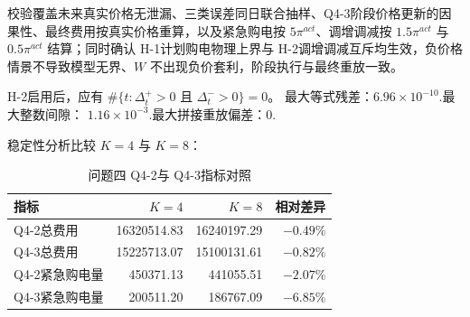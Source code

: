 校验覆盖未来真实价格无泄漏、三类误差同日联合抽样、Q4-3阶段价格更新的因果性、最终费用按真实价格重算，以及紧急购电按 \(5\pi^{act}\)、调增调减按 \(1.5\pi^{act}\) 与 \(0.5\pi^{act}\) 结算；同时确认 H-1计划购电物理上界与 H-2调增调减互斥均生效，负价格情景不导致模型无界、\(W\) 不出现负价套利，阶段执行与最终重放一致。

H-2启用后，应有 \(\#\{t:\Delta_t^+>0\text{ 且 }\Delta_t^->0\}=0\)。 最大等式残差：\(6.96\times10^{-10}.\)最大整数间隙：
\(1.16\times10^{-3}.\)最大拼接重放偏差：\(0.\)

稳定性分析比较 \(K=4\) 与 \(K=8\)：

\begin{table}[H]
\centering
{}
\begin{tabular}{lrrr}
\toprule
指标 & \(K=4\) & \(K=8\) & 相对差异 \\
\midrule
Q4-2总费用 & 16320514.83 & 16240197.29 & $-0.49\%$ \\
Q4-3总费用 & 15225713.07 & 15100131.61 & $-0.82\%$ \\
Q4-2紧急购电量 & 450371.13 & 441055.51 & $-2.07\%$ \\
Q4-3紧急购电量 & 200511.20 & 186767.09 & $-6.85\%$ \\
\bottomrule
\end{tabular}
\caption{问题四 Q4-2与 Q4-3指标对照}
\label{tab:13}
\end{table}
